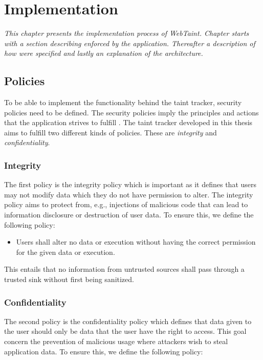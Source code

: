 \chapter{Implementation}
\label{Implementation}
\textit{This chapter presents the implementation process of WebTaint. Chapter starts with a section describing \textit{} enforced by the application. Thereafter a description of how  \textit{} were specified and lastly an explanation of the  \textit{} architecture.}



\section{Policies}
\label{Policies}
To be able to implement the functionality behind the taint tracker, security policies need to be defined. The security policies imply the principles and actions that the application strives to fulfill \parencite{BayukJenniferL2012Cspg}. The taint tracker developed in this thesis aims to fulfill two different kinds of policies. These are \textit{integrity} and \textit{confidentiality}.



\subsection{Integrity}
\label{Integrity}
The first policy is the integrity policy which is important as it defines that users may not modify data which they do not have permission to alter. The integrity policy aims to protect from, e.g., injections of malicious code that can lead to information disclosure or destruction of user data. To ensure this, we define the following policy:

\hfill
\begin{itemize}
    \item Users shall alter no data or execution without having the correct permission for the given data or execution.
\end{itemize}
\hfill

This entails that no information from untrusted sources shall pass through a trusted sink without first being sanitized.



\subsection{Confidentiality}
\label{Confidentiality}
The second policy is the confidentiality policy which defines that data given to the user should only be data that the user have the right to access. This goal concern the prevention of malicious usage where attackers wish to steal application data. To ensure this, we define the following policy:

